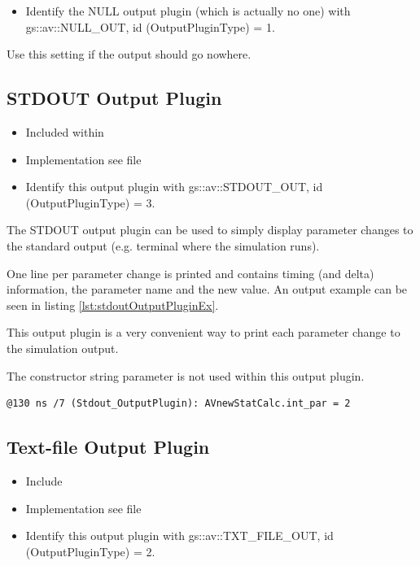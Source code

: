 \begin{itemize}
  \item Identify the NULL output plugin (which is actually no one) with \newline
  	{\sffamily gs::av::NULL\_OUT}, \newline
           id ({\sffamily OutputPluginType}) = 1.
\end{itemize}

Use this setting if the output should go nowhere.

\subsection{STDOUT Output Plugin}
\label{GAVOPstdout}

\begin{itemize}
  \item Included within 
  \item Implementation see file 
  \item Identify this output plugin with {\sffamily gs::av::STDOUT\_OUT}, \newline
           id ({\sffamily OutputPluginType}) = 3.
\end{itemize}

The STDOUT output plugin can be used to simply display parameter changes to the standard output (e.g. terminal where the simulation runs).

One line per parameter change is printed and contains timing (and delta) information, the parameter name and the new value. An output example can be seen in listing \ref{lst:stdoutOutputPluginEx}.

This output plugin is a very convenient way to print each parameter change to the simulation output.

The constructor string parameter is not used within this output plugin.

\begin{lstlisting}[caption={STDOUT output example}, label=lst:stdoutOutputPluginEx]
@130 ns /7 (Stdout_OutputPlugin): AVnewStatCalc.int_par = 2
\end{lstlisting}


\subsection{Text-file Output Plugin}
\label{GAVOPfile}

\begin{itemize}
  \item Include 
  \item Implementation see file 
  \item Identify this output plugin with {\sffamily gs::av::TXT\_FILE\_OUT}, \newline
           id ({\sffamily OutputPluginType}) = 2.
\end{itemize}

